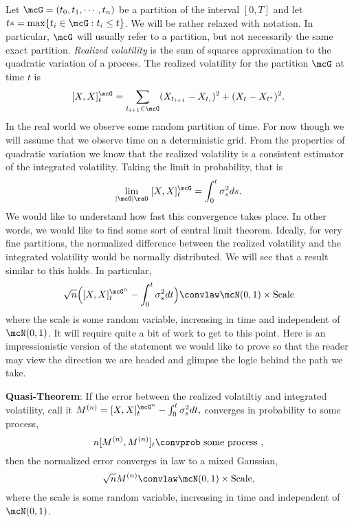 \documentclass{report}
\begin{document}
Let $\mcG = (t_0, t_1, \cdots, t_n)$ be a partition of the interval
$[0,T]$ and let $t* = \max \{ t_i \in \mcG : t_i \leq t \}$.  We will
be rather relaxed with notation.  In particular, $\mcG$ will usually
refer to a partition, but not necessarily the same exact partition.  
\emph{Realized volatility} is the sum of squares approximation to the
quadratic variation of a process.  The realized volatility for the
partition $\mcG$ at time $t$ is
\[
[X,X]^{\mcG}_t = \sum_{t_{i+1} \in \mcG} (X_{t_{i+1}} - X_{t_i})^2 +
(X_{t} - X_{t^*})^2.
\]
In the real world we observe some random partition of time.  For now
though we will assume that we observe time on a deterministic grid. 
From the properties of quadratic variation we know that the realized
volatility is a consistent estimator of the integrated volatility. 
Taking the limit in probability, that is
\[
\lim_{|\mcG| \ra 0} \; [X,X]^{\mcG}_t = \int_0^t \sigma_s^2 ds.
\]
We would like to understand how fast this convergence takes place.  In
other words, we would like to find some sort of central limit theorem. 
Ideally, for very fine partitions, the normalized difference between
the realized volatility and the integrated volatility would be
normally distributed.  We will see that a result similar to this
holds.  In particular,
\[
\sqrt{n} \Big([X,X]^{\mcG^n}_t - \int_0^t \sigma_s^2 dt \Big) \convlaw
\mcN(0,1) \times \textmd{Scale}
\]
where the scale is some random variable, increasing in time and
independent of $\mcN(0,1)$.  It will require quite a bit of work to
get to this point.  Here is an impressionistic version of the
statement we would like to prove so that the reader may view the
direction we are headed and glimpse the logic behind the path we take.

\vspace{12pt} \noindent
\textbf{Quasi-Theorem}: If the error between the realized volatiltiy
and integrated volatility, call it 
\(
M^{(n)} =  [X,X]^{\mcG^n}_t - \int_0^t \sigma_s^2 dt,
\)
converges in probability to some process,
\begin{equation}
\label{hypothesis}
n [M^{(n)},M^{(n)}]_t \convprob \textmd{ some process },
\end{equation}
then the normalized error converges in law to a mixed Gaussian,
\begin{equation}
\label{conclusion}
\sqrt{n} M^{(n)} \convlaw \mcN(0,1) \times \textmd{Scale},
\end{equation}
where the scale is some random variable, increasing in time and
independent of $\mcN(0,1)$.
\end{document}
